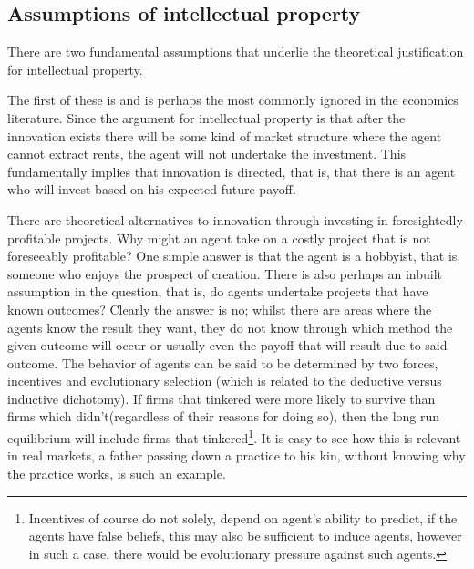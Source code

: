 \subsection{Assumptions of intellectual property}


There are two fundamental assumptions that underlie the theoretical justification for intellectual property. 

The first of these is  and is perhaps the most commonly ignored in the economics literature. Since the argument for intellectual property is that after the innovation exists there will be some kind of market structure where the agent cannot extract rents, the agent will not undertake the investment. This fundamentally implies that innovation is directed, that is, that there is an agent who will invest based on his expected future payoff.

There are theoretical alternatives to innovation through investing in foresightedly profitable projects. Why might an agent take on a costly project that is not foreseeably profitable? One simple answer is that the agent is a hobbyist, that is, someone who enjoys the prospect of creation. There is also perhaps an inbuilt assumption in the question, that is, do agents undertake projects that have known outcomes? Clearly the answer is no; whilst there are areas where the agents know the result they want, they do not know through which method the given outcome will occur or usually even the payoff that will result due to said outcome. The behavior of agents can be said to be determined by two forces, incentives and evolutionary selection (which is related to the deductive versus inductive dichotomy). If firms that tinkered were more likely to survive than firms which didn't(regardless of their reasons for doing so), then the long run equilibrium will include firms that tinkered\footnote{Incentives of course do not solely, depend on agent’s  ability to predict, if the agents have false beliefs, this may also be sufficient to induce agents, however in such a case, there would be evolutionary pressure against such agents.}. It is easy to see how this is relevant in real markets, a father passing down a practice to his kin, without knowing why the practice works, is such an example. 


